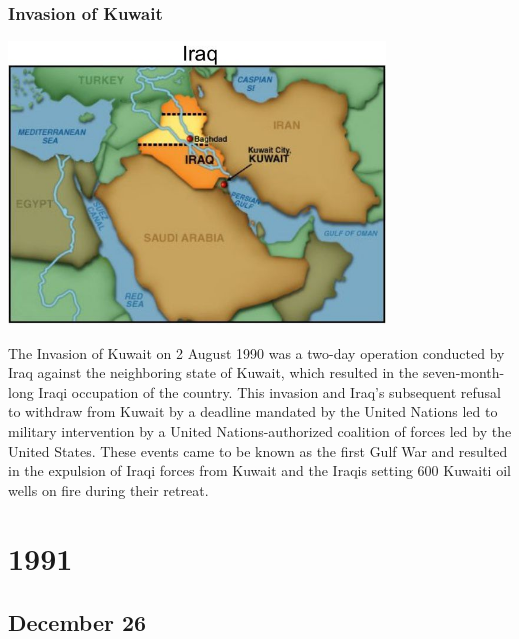 \documentclass[11pt]{report}
\begin{document}
\subsection{Invasion of Kuwait}
\vspace{2mm}\begin{center}\includegraphics[width=10cm]{./img/iraqKuwaitWar.jpg}\end{center}
The Invasion of Kuwait on 2 August 1990 was a two-day operation conducted by Iraq against the neighboring state of Kuwait, which resulted in the seven-month-long Iraqi occupation of the country. This invasion and Iraq's subsequent refusal to withdraw from Kuwait by a deadline mandated by the United Nations led to military intervention by a United Nations-authorized coalition of forces led by the United States. These events came to be known as the first Gulf War and resulted in the expulsion of Iraqi forces from Kuwait and the Iraqis setting 600 Kuwaiti oil wells on fire during their retreat.

\chapter{1991}
\section{December 26}
\end{document}
